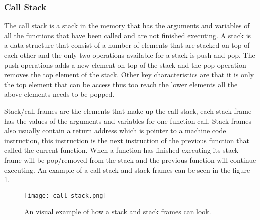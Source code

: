\subsubsection{Call Stack}
The call stack is a stack in the memory that has the arguments and variables of all the functions that have been called and are not finished executing.
A stack is a data structure that consist of a number of elements that are stacked on top of each other and the only two operations available for a stack is push and pop.
The push operations adds a new element on top of the stack and the pop operation removes the top element of the stack.
Other key characteristics are that it is only the top element that can be access thus too reach the lower elements all the above elements needs to be popped.


Stack/call frames are the elements that make up the call stack, each stack frame has the values of the arguments and variables for one function call.
Stack frames also usually contain a return address which is pointer to a machine code instruction, this instruction is the next instruction of the previous function that called the current function.
When a function has finished executing its stack frame will be pop/removed from the stack and the previous function will continue executing. 
An example of a call stack and stack frames can be seen in the figure \ref{fig:callstack}.


\begin{figure}[h]
	\centering
	\texttt{[image: call-stack.png]}
	\caption{An visual example of how a stack and stack frames can look.}
	\label{fig:callstack}
\end{figure}



